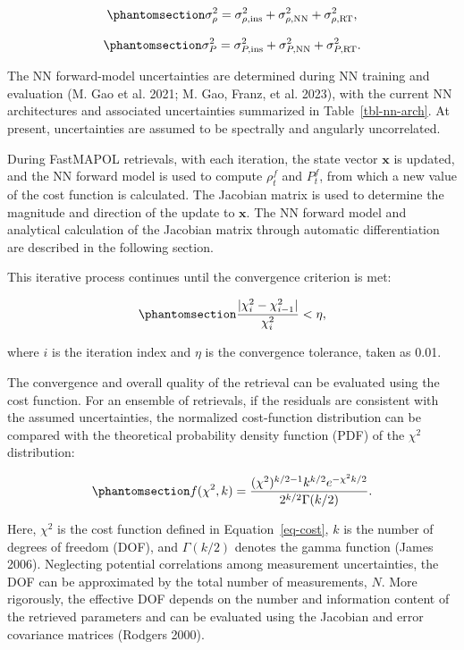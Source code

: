 \documentclass[
  letterpaper,
  open=any]{scrbook}
\begin{document}
\begin{equation}\phantomsection\label{eq-sigma-rho}{
\sigma_\rho^2
=
\sigma_{\rho,\mathrm{ins}}^2
+
\sigma_{\rho,\mathrm{NN}}^2
+
\sigma_{\rho,\mathrm{RT}}^2,
}\end{equation}

\begin{equation}\phantomsection\label{eq-sigma-P}{
\sigma_P^2
=
\sigma_{P,\mathrm{ins}}^2
+
\sigma_{P,\mathrm{NN}}^2
+
\sigma_{P,\mathrm{RT}}^2.
}\end{equation}

The NN forward-model uncertainties are determined during NN training and
evaluation (M. Gao et al. 2021; M. Gao, Franz, et al. 2023), with the
current NN architectures and associated uncertainties summarized in
Table~\ref{tbl-nn-arch}. At present, uncertainties are assumed to be
spectrally and angularly uncorrelated.

During FastMAPOL retrievals, with each iteration, the state vector
\({\mathbf x}\) is updated, and the NN forward model is used to compute
\(\rho_t^f\) and \(P_t^f\), from which a new value of the cost function
is calculated. The Jacobian matrix is used to determine the magnitude
and direction of the update to \({\mathbf x}\). The NN forward model and
analytical calculation of the Jacobian matrix through automatic
differentiation are described in the following section.

This iterative process continues until the convergence criterion is met:

\begin{equation}\phantomsection\label{eq-delta-chi}{
\frac{|\chi_i^2-\chi_{i-1}^2|}
{\chi_i^2}
<
\eta,
}\end{equation}

where \(i\) is the iteration index and \(\eta\) is the convergence
tolerance, taken as 0.01.

The convergence and overall quality of the retrieval can be evaluated
using the cost function. For an ensemble of retrievals, if the residuals
are consistent with the assumed uncertainties, the normalized
cost-function distribution can be compared with the theoretical
probability density function (PDF) of the \(\chi^2\) distribution:

\begin{equation}\phantomsection\label{eq-chi2-pdf}{
f(\chi^2,k)
=
\frac{(\chi^2)^{k/2-1} k^{k/2} e^{-\chi^2 k/2}}
{2^{k/2}\Gamma(k/2)}.
}\end{equation}

Here, \(\chi^2\) is the cost function defined in Equation~\ref{eq-cost},
\(k\) is the number of degrees of freedom (DOF), and \(\Gamma(k/2)\)
denotes the gamma function (James 2006). Neglecting potential
correlations among measurement uncertainties, the DOF can be
approximated by the total number of measurements, \(N\). More
rigorously, the effective DOF depends on the number and information
content of the retrieved parameters and can be evaluated using the
Jacobian and error covariance matrices (Rodgers 2000).
\end{document}
